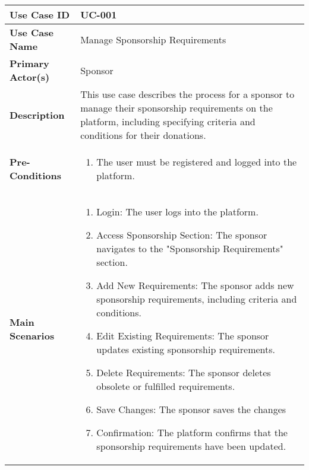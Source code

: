\begin{table}[!ht]
    \centering
    \renewcommand{\arraystretch}{1.3} %
    \begin{tabularx}{\textwidth}{|l|X|}
        \hline
        \textbf{Use Case ID} & UC-001 \\
        \hline
        \textbf{Use Case Name} & Manage Sponsorship Requirements \\
        \hline
        \textbf{Primary Actor(s)} & Sponsor \\
        \hline
        \textbf{Description} &  This use case describes the process for a sponsor to manage their sponsorship requirements on the platform, including specifying criteria and conditions for their donations.\\
        \hline
        \textbf{Pre-Conditions} & 
        \begin{enumerate}[label=\arabic*.,itemsep=0pt]
            \item The user must be registered and logged into the platform.
        \end{enumerate} \\
        \hline
        \textbf{Main Scenarios} & 
        \begin{enumerate}[label=\arabic*.,itemsep=0pt]
            \item Login: The user logs into the platform.
            \item Access Sponsorship Section: The sponsor navigates to the "Sponsorship Requirements" section.
            \item Add New Requirements: The sponsor adds new sponsorship requirements, including criteria and conditions.
            \item Edit Existing Requirements: The sponsor updates existing sponsorship requirements.
            \item Delete Requirements: The sponsor deletes obsolete or fulfilled requirements.
            \item Save Changes: The sponsor saves the changes
            \item Confirmation: The platform confirms that the sponsorship requirements have been updated.
        \end{enumerate} \\
        

\end{tabularx}
\end{table}
